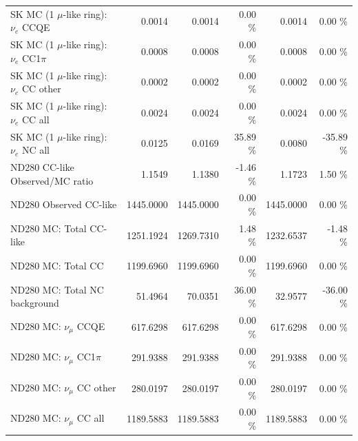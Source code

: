 \begin{table}
\begin{tabular}{| l | r | r  r | r  r |}
                             SK MC (1 $\mu$-like ring): $\nu_{e}$ CCQE &          0.0014 &          0.0014 &  0.00 \%  &          0.0014 &  0.00 \%  \\ 
                         SK MC (1 $\mu$-like ring): $\nu_{e}$ CC1$\pi$ &          0.0008 &          0.0008 &  0.00 \%  &          0.0008 &  0.00 \%  \\ 
                         SK MC (1 $\mu$-like ring): $\nu_{e}$ CC other &          0.0002 &          0.0002 &  0.00 \%  &          0.0002 &  0.00 \%  \\ 
                           SK MC (1 $\mu$-like ring): $\nu_{e}$ CC all &          0.0024 &          0.0024 &  0.00 \%  &          0.0024 &  0.00 \%  \\ 
                           SK MC (1 $\mu$-like ring): $\nu_{e}$ NC all &          0.0125 &          0.0169 & 35.89 \%  &          0.0080 & -35.89 \%  \\ 
\hline
                                       ND280 CC-like Observed/MC ratio &          1.1549 &          1.1380 & -1.46 \%  &          1.1723 &  1.50 \%  \\ 
                                                ND280 Observed CC-like &       1445.0000 &       1445.0000 &  0.00 \%  &       1445.0000 &  0.00 \%  \\ 
                                               ND280 MC: Total CC-like &       1251.1924 &       1269.7310 &  1.48 \%  &       1232.6537 & -1.48 \%  \\ 
                                                    ND280 MC: Total CC &       1199.6960 &       1199.6960 &  0.00 \%  &       1199.6960 &  0.00 \%  \\ 
                                         ND280 MC: Total NC background &         51.4964 &         70.0351 & 36.00 \%  &         32.9577 & -36.00 \%  \\ 
\hline
                                            ND280 MC: $\nu_{\mu}$ CCQE &        617.6298 &        617.6298 &  0.00 \%  &        617.6298 &  0.00 \%  \\ 
                                        ND280 MC: $\nu_{\mu}$ CC1$\pi$ &        291.9388 &        291.9388 &  0.00 \%  &        291.9388 &  0.00 \%  \\ 
                                        ND280 MC: $\nu_{\mu}$ CC other &        280.0197 &        280.0197 &  0.00 \%  &        280.0197 &  0.00 \%  \\ 
                                          ND280 MC: $\nu_{\mu}$ CC all &       1189.5883 &       1189.5883 &  0.00 \%  &       1189.5883 &  0.00 \%  \\ 

\end{tabular}
\end{table}

